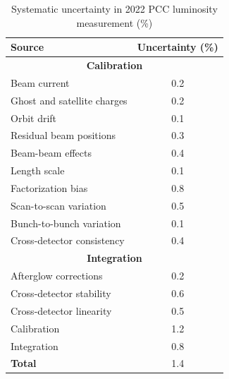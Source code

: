\begin{table}[H]
  \centering
  \caption[Systematic uncertainty in 2022 luminosity measurement]{Systematic uncertainty in 2022 PCC luminosity measurement (\%) \cite{pas_22}}
    \begin{tabular}{l|c}
        \textbf{Source} & \textbf{Uncertainty (\%)} \\
        \hline
        \multicolumn{2}{c}{\textbf{Calibration}} \\
        \hline
        Beam current & 0.2 \\
        Ghost and satellite charges & 0.2 \\
        Orbit drift & 0.1 \\
        Residual beam positions & 0.3 \\
        Beam-beam effects & 0.4 \\
        Length scale & 0.1 \\
        Factorization bias & 0.8 \\
        Scan-to-scan variation & 0.5 \\
        Bunch-to-bunch variation & 0.1 \\
        Cross-detector consistency & 0.4 \\
        \hline
        \multicolumn{2}{c}{\textbf{Integration}} \\
        \hline
        Afterglow corrections & 0.2 \\
        Cross-detector stability & 0.6 \\
        Cross-detector linearity & 0.5 \\
        \hline
        Calibration & 1.2 \\
        Integration & 0.8 \\
        \hline
        \textbf{Total} & 1.4 \\
    \end{tabular}
    \label{table:correction_uncertainties}
\end{table}


